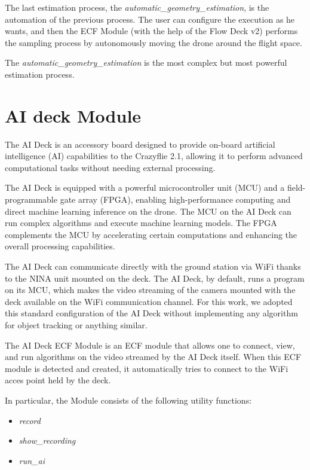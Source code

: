 The last estimation process, the \textit{automatic\_geometry\_estimation}, is the automation of the previous process. 
The user can configure the execution as he wants, and then the ECF Module (with the help of the Flow Deck v2) performs the sampling process by autonomously moving the drone around the flight space.

The \textit{automatic\_geometry\_estimation} is the most complex but most powerful estimation process.

\section{AI deck Module}\label{sec:module_ai_deck}


The AI Deck is an accessory board designed to provide on-board artificial intelligence (AI) capabilities to the Crazyflie 2.1, allowing it to perform advanced computational tasks without needing external processing.

The AI Deck is equipped with a powerful microcontroller unit (MCU) and a field-programmable gate array (FPGA), enabling high-performance computing and direct machine learning inference on the drone.
The MCU on the AI Deck can run complex algorithms and execute machine learning models. 
The FPGA complements the MCU by accelerating certain computations and enhancing the overall processing capabilities.

The AI Deck can communicate directly with the ground station via WiFi thanks to the NINA unit mounted on the deck.
The AI Deck, by default, runs a program on its MCU, which makes the video streaming of the camera mounted with the deck available on the WiFi communication channel.
For this work, we adopted this standard configuration of the AI Deck without implementing any algorithm for object tracking or anything similar.

The AI Deck ECF Module is an ECF module that allows one to connect, view, and run algorithms on the video streamed by the AI Deck itself.
When this ECF module is detected and created, it automatically tries to connect to the WiFi acces point held by the deck.

In particular, the Module consists of the following utility functions:
\begin{itemize}
    \item \textit{record}
    \item \textit{show\_recording}
    \item \textit{run\_ai}
\end{itemize}

